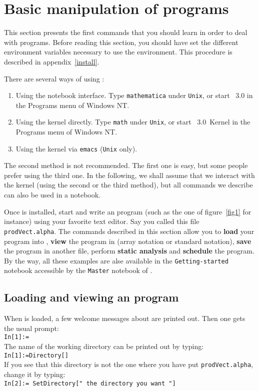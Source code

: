 \section{Basic manipulation of {\Alpha} programs}
\label{chapstart:basic}

This section presents the first commands that you should learn in
order to deal with {\Alpha} programs. Before reading this section, you
should have set the different environment variables necessary to use
the {\mmalfa{}} environment. This procedure is described in
appendix~\ref{install}.

There are several ways of using \mmalfa{}:
\begin{enumerate}
\item Using the notebook interface. Type \texttt{mathematica} under
\texttt{Unix}, or start \mma{}~3.0 in the Programs menu of 
Windows NT.
\item Using the \mma{} kernel directly. Type \texttt{math} under
\texttt{Unix}, or start \mma{}~3.0~Kernel in the Programs menu of 
Windows NT.
\item Using the \mma{} kernel via \texttt{emacs} (\texttt{Unix}
only).
\end{enumerate}

The second method is not recommended. The first one is easy, but
some people prefer using the third one. In the following, we shall
assume that we interact with the kernel (using the second
or the third method), but all commands we describe can also be
used in a notebook. 

Once {\mmalfa{}} is installed, start \mma{} and write an {\Alpha}
program (such as the one of figure~\ref{fig1} for instance) using your
favorite text editor. Say you called this file {\tt
prodVect.alpha}. The commands described in this section allow you to
{\bf load} your program into \mma{}, {\bf view} the program in
\mma{} (array notation or standard notation), {\bf save} the
program in another file, perform {\bf static analysis} and {\bf schedule}
the program. By the way, all these examples are alse available
in the \texttt{Getting-started} notebook accessible by the 
\texttt{Master} notebook of \mmalfa{}.


\subsection{Loading and viewing an {\Alpha} program}
When \mma{} is loaded, a few welcome messages about {\Alpha} are
printed out. 
Then one gets the usual \mma{} prompt:\\ {\tt In[1]:=
}\\ 
The name of the working directory can be printed out
by typing:\\
{\tt In[1]:=Directory[] }\\
If you see that this directory is not the one where you have put 
{\tt prodVect.alpha}, change it by typing:\\
{\tt In[2]:= SetDirectory[" the directory you want "] }\\

